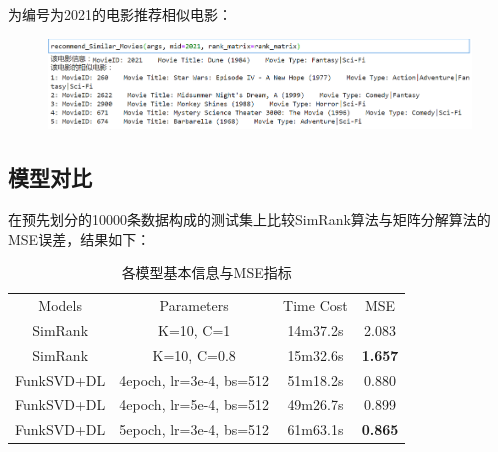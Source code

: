 \begin{spacing}{1.5}
\begin{figure}[h]
\end{figure}\par
\par
为编号为2021的电影推荐相似电影：\par
\begin{figure}[H]
\setlength{\abovecaptionskip}{0.0cm}
\setlength{\belowcaptionskip}{-0.cm}
\centering
\includegraphics[width=1\textwidth]{Figure/svd2.png}
\end{figure}\par
\par
\clearpage


\subsection{模型对比}
在预先划分的10000条数据构成的测试集上比较SimRank算法与矩阵分解算法的MSE误差，结果如下：\par
\begin{table}[h]
\centering
\caption{各模型基本信息与MSE指标}
\label{tab:1}
\begin{tabular}{cccc}
\toprule[2pt]
Models & Parameters & Time Cost & MSE  \\
\noalign{\smallskip}\hline\noalign{\smallskip}
SimRank & K=10, C=1 & 14m37.2s & 2.083 \\
SimRank & K=10, C=0.8& 15m32.6s & \textbf{1.657} \\
\hline\noalign{\smallskip}
FunkSVD+DL & 4epoch, lr=3e-4, bs=512 & 51m18.2s & 0.880 \\
FunkSVD+DL & 4epoch, lr=5e-4, bs=512 & 49m26.7s & 0.899 \\
FunkSVD+DL & 5epoch, lr=3e-4, bs=512 & 61m63.1s & \textbf{0.865} \\

\toprule[2pt]
\end{tabular}


\end{table}


\end{spacing}

\clearpage


\printbibliography%
